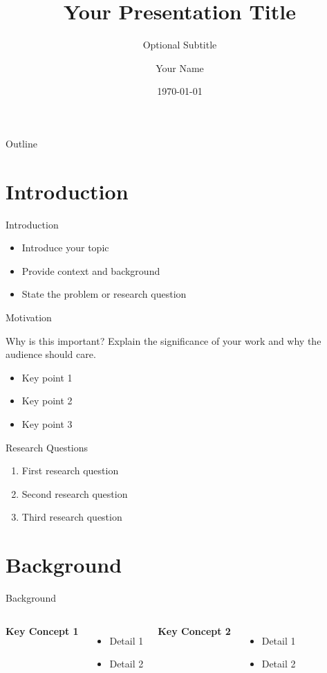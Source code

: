 \documentclass[aspectratio=169]{beamer}
\title{Your Presentation Title}
\subtitle{Optional Subtitle}
\author{Your Name}
\institute{Your Institution \\ Your Department}
\date{\today}
\begin{document}
\begin{frame}
\titlepage
\end{frame}

\begin{frame}{Outline}
\tableofcontents
\end{frame}

\section{Introduction}

\begin{frame}{Introduction}
\begin{itemize}
    \item Introduce your topic
    \item Provide context and background
    \item State the problem or research question
\end{itemize}
\end{frame}

\begin{frame}{Motivation}
\begin{block}{Why is this important?}
Explain the significance of your work and why the audience should care.
\end{block}

\begin{itemize}
    \item Key point 1
    \item Key point 2
    \item Key point 3
\end{itemize}
\end{frame}

\begin{frame}{Research Questions}
\begin{enumerate}
    \item First research question
    \item Second research question
    \item Third research question
\end{enumerate}
\end{frame}

\section{Background}

\begin{frame}{Background}
\begin{columns}
\textbf{Key Concept 1}
\begin{itemize}
    \item Detail 1
    \item Detail 2
\end{itemize}

\textbf{Key Concept 2}
\begin{itemize}
    \item Detail 1
    \item Detail 2
\end{itemize}
\end{columns}
\end{frame}
\end{document}
